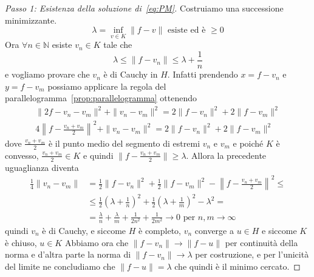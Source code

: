 \begin{proof}[Passo 1: Esistenza della soluzione di~\eqref{eq:PM}]
    Costruiamo una successione minimizzante.
    \[
      \lambda = \inf_{v \in K} \|f-v\| \text{ esiste ed è } \ge 0
    \]
    Ora \(\forall n \in \mathbb{N}\) esiste \(v_{n} \in K\) tale che 
    \[
      \lambda \le \| f- v_{n}\| \le \lambda + \frac{1}{n}
    \] e vogliamo provare che \(v_{n}\) è di Cauchy in \(H\). Infatti prendendo
    \(x = f - v_{n}\) e \(y = f - v_{m}\) possiamo applicare la regola del
    parallelogramma~\ref{prop:parallelogramma} ottenendo
    \begin{align*}
        \|2f - v_{n} - v_{m}\|^2 + \|v_{n} - v_{m}\|^2 = 2\|f - v_{n}\|^2 + 2\|f
        - v_{m}\|^2 \\
        4\left\|f - \frac{v_{n} + v_{m}}{2}\right\|^2 + \|v_{n} - v_{m}\|^2 = 2\|f -
        v_{n}\|^2 + 2\|f - v_{m}\|^2
    \end{align*}
    dove \(\frac{v_{n} + v_{m}}{2}\) è il punto medio del segmento di estremi
    \(v_{n}\) e \(v_{m}\) e poiché \(K\) è convesso, \(\frac{v_{n}+v_{m}}{2} \in
    K\) e quindi \(\|f - \frac{v_{n} + v_{m}}{2}\| \ge \lambda\). Allora la
    precedente uguaglianza diventa
    \begin{align*}
        \frac{1}{4}\|v_{n} - v_{m}\| &= \frac{1}{2}\|f - v_{n}\|^2 +
      \frac{1}{2}\|f - v_{m}\|^2 - \left\|f - \frac{v_{n} + v_{m}}{2}\right\|^2
      \le 
      \\ &\le \frac{1}{2}{\left( \lambda + \frac{1}{n} \right)} ^2 +
        \frac{1}{2}{\left( \lambda + \frac{1}{m} \right)}^2 - \lambda^2 = \\ &=
      \frac{\lambda}{n} + \frac{\lambda}{m} + \frac{1}{2n^2} + \frac{1}{2m^2}
      \longrightarrow 0 \text{ per } n, m \to \infty
    \end{align*}
    quindi \(v_{n}\) è di Cauchy, e siccome \(H\) è
    completo, \(v_{n}\) converge a \(u \in H\) e siccome \(K\) è chiuso, \(u \in
    K\) 
    Abbiamo ora che \(\|f-v_{n}\| \to \|f - u\|\) per continuità della norma e
    d'altra parte la norma di \(\|f - v_{n}\| \to \lambda\) per costruzione, e
    per l'unicità del limite ne concludiamo che \(\|f - u\| = \lambda\) che
    quindi è il minimo cercato.
\end{proof}

